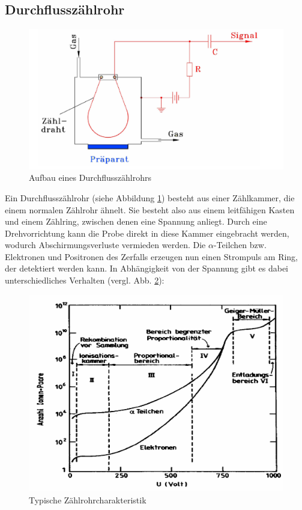 \subsection{Durchflusszählrohr}
\begin{figure}[H]
 \centering \includegraphics[width=0.9\linewidth]{Bilder/zaehlrohr.png}
 \caption{Aufbau eines Durchflusszählrohrs}
 \label{durchflusszaehlrohr}
\end{figure}
Ein Durchflusszählrohr (siehe Abbildung \ref{durchflusszaehlrohr}) besteht aus einer Zählkammer, die einem normalen Zählrohr ähnelt. Sie besteht also aus einem leitfähigen Kasten und einem Zählring, zwischen denen eine Spannung anliegt. Durch eine Drehvorrichtung kann die Probe direkt in diese Kammer eingebracht werden, wodurch Abschirmungsverluste vermieden werden. Die $\alpha$-Teilchen bzw. Elektronen und Positronen des Zerfalls erzeugen nun einen Strompuls am Ring, der detektiert werden kann. In Abhängigkeit von der Spannung gibt es dabei unterschiedliches Verhalten (vergl. Abb. \ref{theoriezaehlrohrcharakteristik}):
\begin{figure}[h]
 \centering \includegraphics[width=0.9\linewidth]{Bilder/zaehlrohrcharakteristik.png}
 \caption{Typische Zählrohrcharakteristik}
 \label{theoriezaehlrohrcharakteristik}
\end{figure}
